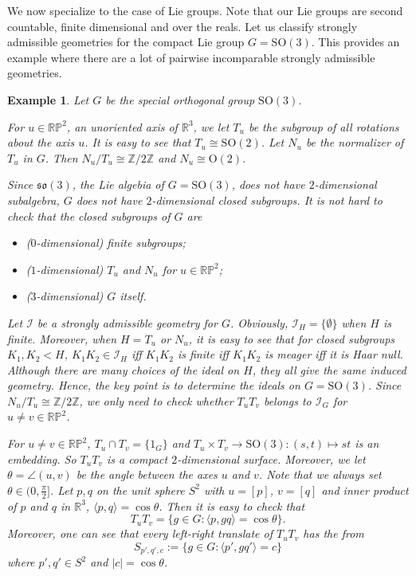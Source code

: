 \documentclass{article}
\newtheorem{example}[definition]{Example}
\newcommand{\Z}{\mathbb{Z}}
\newcommand{\R}{\mathbb{R}}
\newcommand{\I}{\mathcal{I}}
\newcommand{\SO}{\mathrm{SO}}
\newcommand{\RP}{\mathbb{RP}}
\begin{document}
We now specialize to the case of Lie groups. Note that our Lie groups are second countable, finite dimensional and over the reals. Let us classify strongly admissible geometries for the compact Lie group $G=\SO(3)$. This provides an example where there are a lot of pairwise incomparable strongly admissible geometries.

\begin{example}
Let $G$ be the special orthogonal group $\SO(3)$. 

For $u\in \RP^2$, an unoriented axis of $\R^3$, we let $T_u$ be the subgroup of all rotations about the axis $u$. It is easy to see that $T_u\cong \SO(2)$. Let $N_u$ be the normalizer of $T_u$ in $G$. Then $N_u/T_u\cong\Z/2\Z$ and $N_u\cong \mathrm{O}(2)$.

Since $\mathfrak{so}(3)$, the Lie algebia of $G=\SO(3)$, does not have $2$-dimensional subalgebra, $G$ does not have $2$-dimensional closed subgroups. It is not hard to check that the closed subgroups of $G$ are
\begin{itemize}
\item ($0$-dimensional) finite subgroups;

\item ($1$-dimensional) $T_u$ and $N_u$ for $u\in \RP^2$;

\item ($3$-dimensional) $G$ itself.
\end{itemize}

Let $\I$ be a strongly admissible geometry for $G$. Obviously, $\I_H=\{\emptyset\}$ when $H$ is finite.
Moreover, when $H=T_u$ or $N_u$, it is easy to see that for closed subgroups $K_1,K_2<H$, $K_1K_2\in \I_H$ iff $K_1K_2$ is finite iff $K_1K_2$ is meager iff it is Haar null. Although there are many choices of the ideal on $H$, they all give the same induced geometry. Hence, the key point is to determine the ideals on $G=\SO(3)$. Since $N_u/T_u\cong\Z/2\Z$, we only need to check whether $T_uT_v$ belongs to $\I_G$ for $u\neq v\in \RP^2$.


For $u\neq v\in \RP^2$, $T_u\cap T_v=\{1_G\}$ and $T_u\times T_v\rightarrow \SO(3):(s,t)\mapsto st$ is an embedding. So $T_uT_v$ is a compact $2$-dimensional surface.
Moreover, we let $\theta=\angle(u,v)$ be the angle between the axes $u$ and $v$. Note that we always set $\theta\in(0,\frac{\pi}{2}]$. Let $p,q$ on the unit sphere $S^2$ with $u=[p]$, $v=[q]$ and inner product of $p$ and $q$ in $\R^3$, $\langle p,q \rangle=\cos\theta$. Then it is easy to check that 
$$T_uT_v=\{g\in G: \langle p,gq \rangle=\cos \theta \}.$$
Moreover, one can see that every left-right translate of $T_uT_v$ has the from 
$$S_{p',q',c}:=\{g\in G: \langle p',gq' \rangle= c \}$$
where $p',q'\in S^2$ and $|c|=\cos \theta$.


\end{example}
\end{document}
